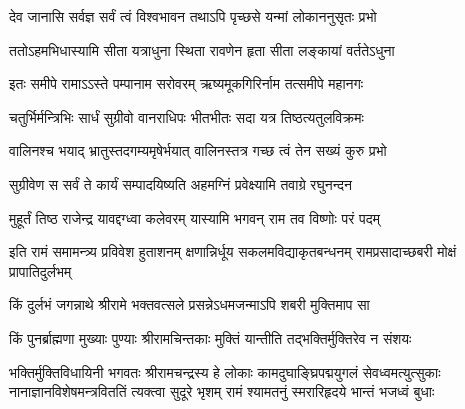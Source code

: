 
\twolineshloka
{देव जानासि सर्वज्ञ सर्वं त्वं विश्वभावन}
{तथाऽपि पृच्छसे यन्मां लोकाननुसृतः प्रभो} %

\twolineshloka
{ततोऽहमभिधास्यामि सीता यत्राधुना स्थिता}
{रावणेन हृता सीता लङ्कायां वर्ततेऽधुना} %

\twolineshloka
{इतः समीपे रामाऽऽस्ते पम्पानाम सरोवरम्}
{ऋष्यमूकगिरिर्नाम तत्समीपे महानगः} %

\twolineshloka
{चतुर्भिर्मन्त्रिभिः सार्धं सुग्रीवो वानराधिपः}
{भीतभीतः सदा यत्र तिष्ठत्यतुलविक्रमः} %

\twolineshloka
{वालिनश्च भयाद् भ्रातुस्तदगम्यमृषेर्भयात्}
{वालिनस्तत्र गच्छ त्वं तेन सख्यं कुरु प्रभो} %

\twolineshloka
{सुग्रीवेण स सर्वं ते कार्यं सम्पादयिष्यति}
{अहमग्निं प्रवेक्ष्यामि तवाग्रे रघुनन्दन} %

\twolineshloka
{मुहूर्तं तिष्ठ राजेन्द्र यावद्दग्ध्वा कलेवरम्}
{यास्यामि भगवन् राम तव विष्णोः परं पदम्} %

\threelineshloka
{इति रामं समामन्त्र्य प्रविवेश हुताशनम्}
{क्षणान्निर्धूय सकलमविद्याकृतबन्धनम्}
{रामप्रसादाच्छबरी मोक्षं प्रापातिदुर्लभम्} %

\twolineshloka
{किं दुर्लभं जगन्नाथे श्रीरामे भक्तवत्सले}
{प्रसन्नेऽधमजन्माऽपि शबरी मुक्तिमाप सा} %

\twolineshloka
{किं पुनर्ब्राह्मणा मुख्याः पुण्याः श्रीरामचिन्तकाः}
{मुक्तिं यान्तीति तद्भक्तिर्मुक्तिरेव न संशयः} %

\fourlineindentedshloka
{भक्तिर्मुक्तिविधायिनी भगवतः श्रीरामचन्द्रस्य हे}
{लोकाः कामदुघाङ्घ्रिपद्मयुगलं सेवध्वमत्युत्सुकाः}
{नानाज्ञानविशेषमन्त्रविततिं त्यक्त्वा सुदूरे भृशम्}
{रामं श्यामतनुं स्मरारिहृदये भान्तं भजध्वं बुधाः} %



